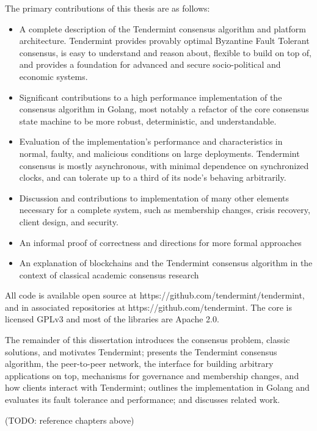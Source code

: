 The primary contributions of this thesis are as follows:


\begin{itemize}  

    \item A complete description of the Tendermint consensus algorithm and platform architecture. Tendermint provides provably optimal Byzantine Fault Tolerant consensus, is easy to understand and reason about, flexible to build on top of, and provides a foundation for advanced and secure socio-political and economic systems. 

    \item Significant contributions to a high performance implementation of the consensus algorithm in Golang, most notably a refactor of the core consensus state machine to be more robust, deterministic, and understandable.

    \item Evaluation of the implementation's performance and characteristics in normal, faulty, and malicious conditions on large deployments. Tendermint consensus is mostly asynchronous, with minimal dependence on synchronized clocks, and can tolerate up to a third of its node's behaving arbitrarily. 

    \item Discussion and contributions to implementation of many other elements necessary for a complete system, such as membership changes, crisis recovery, client design, and security.

    \item An informal proof of correctness and directions for more formal approaches

    \item An explanation of blockchains and the Tendermint consensus algorithm in the context of classical academic consensus research 
\end{itemize}

All code is available open source at https://github.com/tendermint/tendermint, and in associated repositories at https://github.com/tendermint. 
The core is licensed GPLv3 and most of the libraries are Apache 2.0.

The remainder of this dissertation introduces the consensus problem, classic solutions, and motivates Tendermint;
presents the Tendermint consensus algorithm, the peer-to-peer network, the interface for building arbitrary applications on top,  
mechanisms for governance and membership changes, and how clients interact with Tendermint;
outlines the implementation in Golang and evaluates its fault tolerance and performance;
and discusses related work.

(TODO: reference chapters above)
